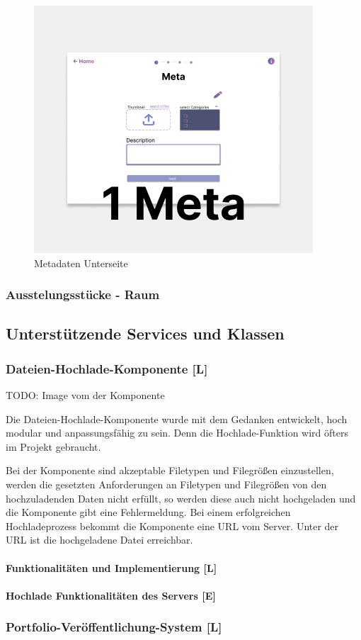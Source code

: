 \begin{figure}
    \centering
    \includegraphics[scale=0.5]{pics/metadaten.png}
    \caption{Metadaten Unterseite}
    \label{fig:impl:creation:Metadaten_Unterseite}
\end{figure}

\subsubsection{Ausstelungsstücke - Raum}
\subsection{Unterstützende Services und Klassen}
\label{sec::impl::contentcreation::UnterstuetzendeServicesUndKlassen}
\subsubsection{Dateien-Hochlade-Komponente [L]}
\label{sec:impl:contentcreation:file-Upload}

TODO: Image vom der Komponente

Die Dateien-Hochlade-Komponente wurde mit dem Gedanken entwickelt, hoch modular und anpassungsfähig zu sein. Denn die Hochlade-Funktion wird öfters im Projekt gebraucht.

Bei der Komponente sind akzeptable Filetypen und Filegrößen einzustellen, werden die gesetzten Anforderungen an Filetypen und Filegrößen von den hochzuladenden Daten nicht erfüllt, so werden diese auch nicht hochgeladen und die Komponente gibt eine Fehlermeldung.
Bei einem erfolgreichen Hochladeprozess bekommt die Komponente eine URL vom Server. Unter der URL ist die hochgeladene Datei erreichbar.

\paragraph{Funktionalitäten und Implementierung [L]}
\paragraph{Hochlade Funktionalitäten des Servers [E]}


\subsubsection{Portfolio-Veröffentlichung-System [L]}